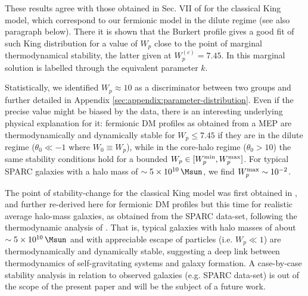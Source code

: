 These results agree with those obtained in Sec. VII of \citet{2015PhRvD..91f3531C} for the classical King model, which correspond to our fermionic model in the dilute regime (see also paragraph below). There it is shown that the Burkert profile gives a good fit of such King distribution for a value of $W_p$ close to the point of marginal thermodynamical stability, the latter given at $W_p^{(c)} = 7.45$. In \citet{2015PhRvD..91f3531C} this marginal solution is labelled through the equivalent parameter $k$.

Statistically, we identified $W_p \approx 10$ as a discriminator between two groups and further detailed in Appendix \ref{sec:appendix:parameter-distribution}. Even if the precise value might be biased by the data, there is an interesting underlying physical explanation for it: fermionic DM profiles as obtained from a MEP are thermodynamically and dynamically stable for $W_p \leq 7.45$ if they are in the dilute regime ($\theta_0 \ll -1$ where $W_0 \equiv W_p$), while in the core-halo regime ($\theta_0 > 10$) the same stability conditions hold for a bounded $W_p \in [W_p^{\rm min}, W_p^{\rm max}]$. For typical SPARC galaxies with a halo mass of $\sim \SI{5E10}{\Msun}$, we find $W_p^{\rm max}\sim \num{E-2}$.


The point of stability-change for the classical King model was first obtained in \cite{2015PhRvD..91f3531C}, and further re-derived here for fermionic DM profiles but this time for realistic average halo-mass galaxies, as obtained from the SPARC data-set, following the thermodynamic analysis of \cite{2021MNRAS.502.4227A}. That is, typical galaxies with halo masses of about $\sim \SI{5E10}{\Msun}$ and with appreciable escape of particles (i.e. $W_p \ll 1$) are thermodynamically and dynamically stable, suggesting a deep link between thermodynamics of self-gravitating systems and galaxy formation. A case-by-case stability analysis in relation to observed galaxies (e.g. SPARC data-set) is out of the scope of the present paper and will be the subject of a future work. 
